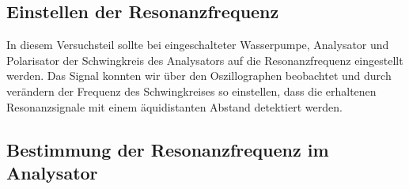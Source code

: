 \documentclass[paper=a4,
	fontsize=10pt,
	DIV=18,
	twocolumn,
	parskip=half
	]{scrartcl}
\numberwithin{equation}{section}    %
\begin{document}

\subsection{Einstellen der Resonanzfrequenz}
\label{auswertung2}

In diesem Versuchsteil sollte bei eingeschalteter Wasserpumpe, Analysator und Polarisator der Schwingkreis des Analysators auf die Resonanzfrequenz eingestellt werden. Das Signal konnten wir über den Oszillographen beobachtet und durch verändern der Frequenz des Schwingkreises so einstellen, dass die erhaltenen Resonanzsignale mit einem äquidistanten Abstand detektiert werden.


\subsection{Bestimmung der Resonanzfrequenz im Analysator}
\label{auswertung3}
\end{document}
